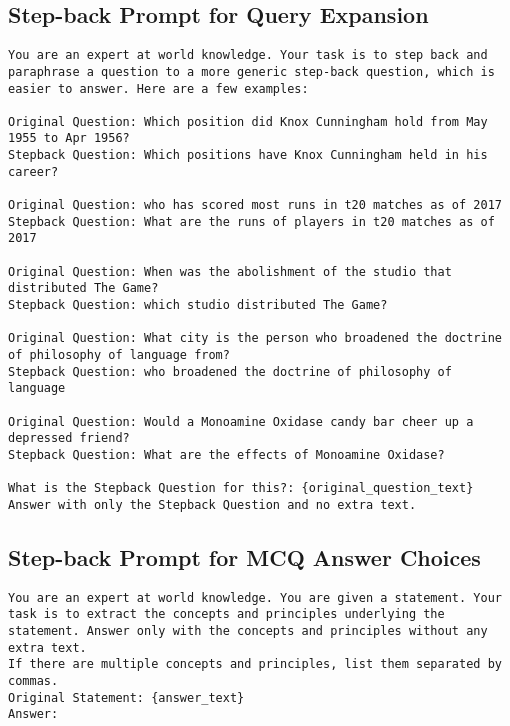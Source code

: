 \subsection{Step-back Prompt for Query Expansion}
\begin{lstlisting}
You are an expert at world knowledge. Your task is to step back and paraphrase a question to a more generic step-back question, which is easier to answer. Here are a few examples:

Original Question: Which position did Knox Cunningham hold from May 1955 to Apr 1956?
Stepback Question: Which positions have Knox Cunningham held in his career?
        
Original Question: who has scored most runs in t20 matches as of 2017
Stepback Question: What are the runs of players in t20 matches as of 2017
        
Original Question: When was the abolishment of the studio that distributed The Game?
Stepback Question: which studio distributed The Game?
        
Original Question: What city is the person who broadened the doctrine of philosophy of language from?
Stepback Question: who broadened the doctrine of philosophy of language
        
Original Question: Would a Monoamine Oxidase candy bar cheer up a depressed friend?
Stepback Question: What are the effects of Monoamine Oxidase?
        
What is the Stepback Question for this?: {original_question_text}
Answer with only the Stepback Question and no extra text.
\end{lstlisting}

\subsection{Step-back Prompt for MCQ Answer Choices}
\begin{lstlisting}
You are an expert at world knowledge. You are given a statement. Your task is to extract the concepts and principles underlying the statement. Answer only with the concepts and principles without any extra text.
If there are multiple concepts and principles, list them separated by commas.
Original Statement: {answer_text}
Answer:\end{lstlisting}



